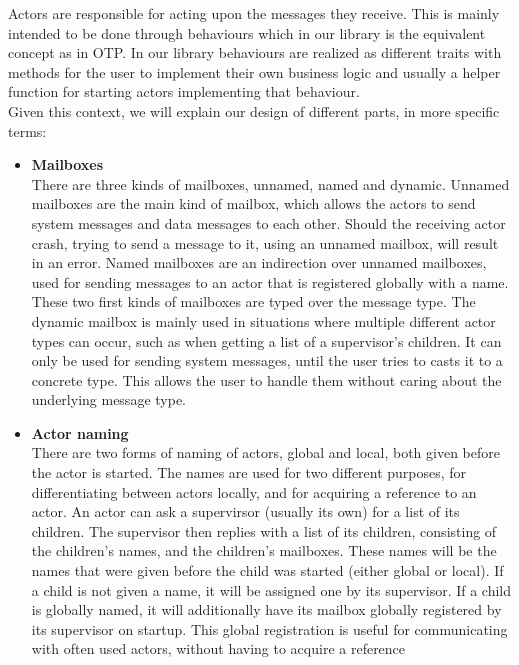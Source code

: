\documentclass[a4paper]{article}
\begin{document}
\noindent
Actors are responsible for acting upon the messages they receive. This is mainly
intended to be done through behaviours which in our library is the equivalent
concept as in OTP. In our library behaviours are realized as different traits
with methods for the user to implement their own business logic and usually a
helper function for starting actors implementing that behaviour.\\

\noindent
Given this context, we will explain our design of different parts, in more
specific terms:
\begin{itemize}
\item \textbf{Mailboxes}\\
  There are three kinds of mailboxes, unnamed, named and dynamic. Unnamed mailboxes are
  the main kind of mailbox, which allows the actors to send system messages and
  data messages to each other. Should the receiving actor crash, trying to send
  a message to it, using an unnamed mailbox, will result in an error. Named
  mailboxes are an indirection over unnamed mailboxes, used for sending messages
  to an actor that is registered globally with a name. These two first kinds of
  mailboxes are typed over the message type. The dynamic mailbox is mainly used
  in situations where multiple different actor types can occur, such as when
  getting a list of a supervisor's children. It can only be used for sending
  system messages, until the user tries to casts it to a concrete type. This
  allows the user to handle them without caring about the underlying message
  type.
\item \textbf{Actor naming}\\
  There are two forms of naming of actors, global and local, both given before
  the actor is started. The names are used for two different purposes, for
  differentiating between actors locally, and for acquiring a reference to an actor.
  An actor can ask a supervirsor (usually its own) for a list of its children.
  The supervisor then replies with a list of its children, consisting of the
  children's names, and the children's mailboxes. These names will be the names
  that were given before the child was started (either global or local). If a
  child is not given a name, it will be assigned one by its supervisor. If a
  child is  globally named, it will additionally have its mailbox globally
  registered by  its supervisor on startup. This global registration is useful
  for communicating with often used actors, without having to acquire a reference

\end{itemize}
\end{document}
